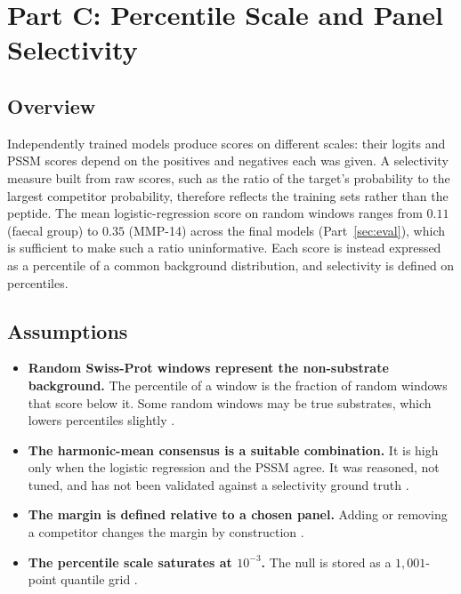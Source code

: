 \section{Part C: Percentile Scale and Panel Selectivity}
\label{sec:panel}

\subsection{Overview}

Independently trained models produce scores on different scales: their logits
and PSSM scores depend on the positives and negatives each was given. A
selectivity measure built from raw scores, such as the ratio of the target's
probability to the largest competitor probability, therefore reflects the
training sets rather than the peptide. The mean logistic-regression score on
random windows ranges from $0.11$ (faecal group) to $0.35$ (MMP-14) across the
final models (Part~\ref{sec:eval}), which is sufficient to make such a ratio
uninformative. Each score is instead expressed as a percentile of a common
background distribution, and selectivity is defined on percentiles.

\subsection{Assumptions}

\begin{assump}
\begin{itemize}[leftmargin=*,noitemsep]
\item \textbf{Random Swiss-Prot windows represent the non-substrate
  background.} The percentile of a window is the fraction of random windows
  that score below it. Some random windows may be true substrates, which lowers
  percentiles slightly \FLAG.
\item \textbf{The harmonic-mean consensus is a suitable combination.} It is
  high only when the logistic regression and the PSSM agree. It was reasoned,
  not tuned, and has not been validated against a selectivity ground truth
  \FLAG.
\item \textbf{The margin is defined relative to a chosen panel.} Adding or
  removing a competitor changes the margin by construction \CONF.
\item \textbf{The percentile scale saturates at $10^{-3}$.} The null is stored
  as a $1{,}001$-point quantile grid \CONF.
\end{itemize}
\end{assump}

